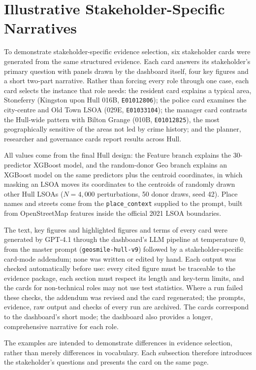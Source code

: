 \section{Illustrative Stakeholder-Specific Narratives}
\label{SEC:stakeholder_narrative_examples}

To demonstrate stakeholder-specific evidence selection, six stakeholder cards were generated from
the same structured evidence. Each card answers its stakeholder's primary question with panels
drawn by the dashboard itself, four key figures and a short two-part narrative. Rather than
forcing every role through one case, each card selects the instance that role needs: the resident
card explains a typical area, Stoneferry (Kingston upon Hull 016B, \texttt{E01012806}); the police
card examines the city-centre and Old Town LSOA (029E, \texttt{E01033104}); the manager card
contrasts the Hull-wide pattern with Bilton Grange (010B, \texttt{E01012825}), the most geographically sensitive of the areas not led by crime history; and the planner,
researcher and governance cards report results across Hull.

All values come from the final Hull design: the Feature branch explains the 30-predictor
XGBoost model, and the random-donor Geo branch explains an XGBoost model on the same predictors
plus the centroid coordinates, in which masking an LSOA moves its coordinates to the centroids of
randomly drawn other Hull LSOAs ($N=4{,}000$ perturbations, 50 donor draws, seed 42). Place names and streets
come from the \texttt{place\_context} supplied to the prompt, built from OpenStreetMap features
inside the official 2021 LSOA boundaries.

The text, key figures and highlighted figures and terms of every card were generated by GPT-4.1
through the dashboard's LLM pipeline at temperature 0, from the master prompt
(\texttt{geosmile-hull-v9}) followed by a stakeholder-specific card-mode addendum; none was written
or edited by hand. Each output was checked automatically before use: every cited figure must be
traceable to the evidence package, each section must respect its length and key-term limits, and
the cards for non-technical roles may not use test statistics. Where a run failed these checks,
the addendum was revised and the card regenerated; the prompts, evidence, raw output and checks
of every run are archived. The cards correspond to the dashboard's short mode; the dashboard also
provides a longer, comprehensive narrative for each role.

The examples are intended to demonstrate differences in evidence selection, rather than merely
differences in vocabulary. Each subsection therefore introduces the stakeholder's questions and
presents the card on the same page.
